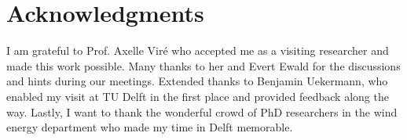 \documentclass{layout/tudelft-aiaa}
\begin{document}




\section*{Acknowledgments}

I am grateful to Prof. Axelle Viré who accepted me as a visiting researcher and made this work possible. Many thanks to her and Evert Ewald for the discussions and hints during our meetings. Extended thanks to Benjamin Uekermann, who enabled my visit at TU Delft in the first place and provided feedback along the way. Lastly, I want to thank the wonderful crowd of PhD researchers in the wind energy department who made my time in Delft memorable.


\printbibliography

\begin{comment}
\section*{Appendix}

Possible points to include in the Appendix
\begin{itemize}
\item Files from the OpenFOAM adapter with hints on how to modify them
\item Files from AspFAST with hints on how to reuse the code for our mapping
\end{itemize}
\end{comment}
\end{document}
